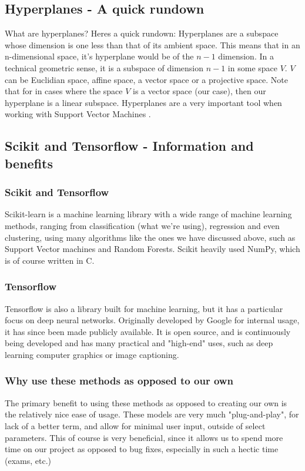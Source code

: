 \documentclass{article}
\begin{document}
\subsection{Hyperplanes - A quick rundown} \label{hyperp}
What are hyperplanes? Heres a quick rundown:
\newline Hyperplanes are a subspace whose dimension is one less than that of its ambient space. This means that in an n-dimensional space, it's hyperplane would be of the $n-1$ dimension. \newline
In a technical geometric sense, it is a subspace of dimension $n-1$ in some space $V$. $V$ can be Euclidian space, affine space, a vector space or a projective space. \newline
Note that for in cases where the space $V$ is a vector space (our case), then our hyperplane is a linear subspace.
\newline Hyperplanes are a very important tool when working with Support Vector Machines \cite{hplanes}.
\subsection{Scikit and Tensorflow - Information and benefits} \label{tensorf}
\subsubsection*{Scikit and Tensorflow}
Scikit-learn is a machine learning library with a wide range of machine learning methods, ranging from classification (what we're using), regression and even clustering, using many algorithms like the ones we have discussed above, such as Support Vector machines and Random Forests. Scikit heavily used NumPy, which is of course written in C.
\subsubsection*{Tensorflow}
Tensorflow is also a library built for machine learning, but it has a particular focus on deep neural networks. Originally developed by Google for internal usage, it has since been made publicly available. It is open source, and is continuously being developed and has many practical and "high-end" uses, such as deep learning computer graphics or image captioning.
\subsubsection*{Why use these methods as opposed to our own}
The primary benefit to using these methods as opposed to creating our own is the relatively nice ease of usage. These models are very much "plug-and-play", for lack of a better term, and allow for minimal user input, outside of select parameters. This of course is very beneficial, since it allows us to spend more time on our project as opposed to bug fixes, especially in such a hectic time (exams, etc.)
\end{document}
